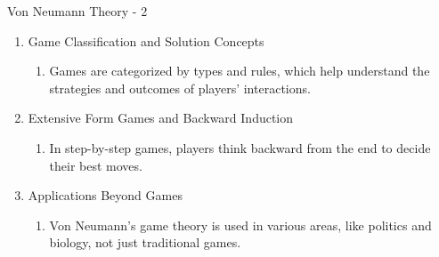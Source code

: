 \documentclass[xetex,notheorems,hyperref={pdfpagelabels=true},xcolor=table]{beamer}
\theoremstyle{plain}
\theoremstyle{definition}
\theoremstyle{example}
\theoremstyle{example}
\begin{document}
\begin{frame}{Von Neumann Theory - 2}
    \begin{enumerate}\addtocounter{enumi}{3}
        \item Game Classification and Solution Concepts
        \begin{enumerate}
            \item Games are categorized by types and rules, which help understand the strategies and outcomes of players' interactions.
        \end{enumerate}
        \item Extensive Form Games and Backward Induction
        \begin{enumerate}
            \item In step-by-step games, players think backward from the end to decide their best moves.
        \end{enumerate}
        \item Applications Beyond Games
        \begin{enumerate}
            \item Von Neumann's game theory is used in various areas, like politics and biology, not just traditional games.
        \end{enumerate}
    \end{enumerate}
    \begin{figure}[h]
  \centering
\end{figure}
\end{frame}
\end{document}
